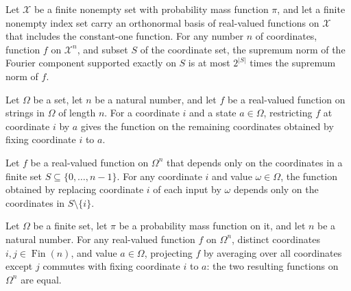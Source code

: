 \begin{theorem}
\label{FABL.FiniteFourierBasis.productSupNorm_orthogonalComponent_le}
\leanok
{}
Let $\mathcal{X}$ be a finite nonempty set with probability mass function $\pi$, and let
a finite nonempty index set carry an orthonormal basis of real-valued functions on
$\mathcal{X}$ that includes the constant-one function. For any number $n$ of
coordinates, function $f$ on $\mathcal{X}^n$, and subset $S$ of the coordinate set, the
supremum norm of the Fourier component supported exactly on $S$ is at most $2^{|S|}$
times the supremum norm of $f$.
\end{theorem}

\begin{definition}
\label{FABL.restrictProductCoordinate}
\leanok
{}
Let $\Omega$ be a set, let $n$ be a natural number, and let $f$ be a real-valued
function on strings in $\Omega$ of length $n$. For a coordinate $i$ and a state $a\in\Omega$,
restricting $f$ at coordinate $i$ by $a$ gives the function on the remaining coordinates
obtained by fixing coordinate $i$ to $a$.
\end{definition}

\begin{theorem}
\label{FABL.restrictProductCoordinate_dependsOnly}
\leanok
{}
Let $f$ be a real-valued function on $\Omega^n$ that depends only on the coordinates in
a finite set $S\subseteq\{0,\ldots,n-1\}$. For any coordinate $i$ and value
$\omega\in\Omega$, the function obtained by replacing coordinate $i$ of each input by
$\omega$ depends only on the coordinates in $S\setminus\{i\}$.
\end{theorem}

\begin{theorem}
\label{FABL.coordinateProjection_restrictProductCoordinate}
\leanok
{}
Let $\Omega$ be a finite set, let $\pi$ be a probability mass function on it, and let
$n$ be a natural number. For any real-valued function $f$ on $\Omega^n$, distinct
coordinates $i,j\in\operatorname{Fin}(n)$, and value $a\in\Omega$, projecting $f$ by
averaging over all coordinates except $j$ commutes with fixing coordinate $i$ to $a$:
the two resulting functions on $\Omega^n$ are equal.
\end{theorem}

